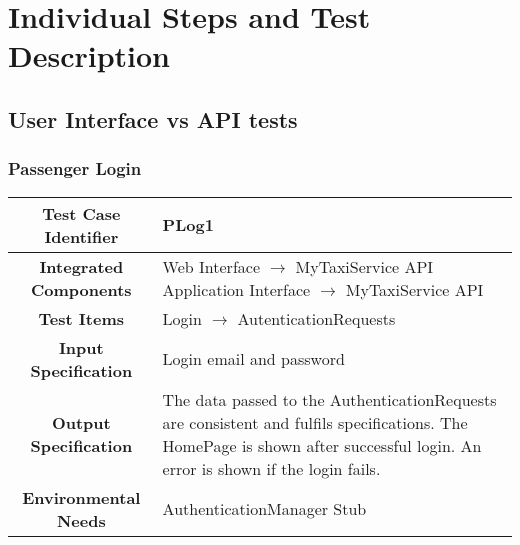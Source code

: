 \documentclass[11pt, a4paper,titlepage]{article}
\begin{document}
	\section{Individual Steps and Test Description}
	\subsection{User Interface vs API tests}
	\subsubsection{Passenger Login}
	\begin{tabularx}{\textwidth}{| c|X|}
		\hline \textbf{Test Case Identifier} & \label{PLog1}PLog1 \\
		\hline \textbf{Integrated Components} & Web Interface $\rightarrow $ MyTaxiService API \newline 
		Application Interface $\rightarrow $ MyTaxiService API \\
		\hline \textbf{Test Items} & Login $\rightarrow $ AutenticationRequests	 \\
		\hline \textbf{Input Specification} & Login email and password \\
		\hline \textbf{Output Specification} & 
		The data passed to the AuthenticationRequests are consistent and fulfils specifications.\newline
		The HomePage is shown after successful login.\newline
		An error is shown if the login fails. \\
		\hline \textbf{Environmental Needs} & AuthenticationManager Stub
		\\
		\hline
	\end{tabularx}
	\newline
	\newline
\end{document}
